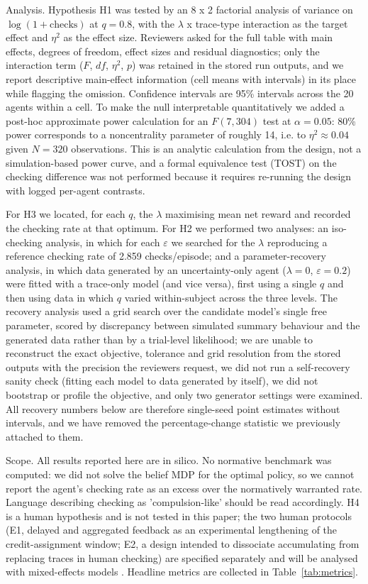 \documentclass[11pt,a4paper]{article}
\begin{document}
Analysis. Hypothesis H1 was tested by an 8 x 2 factorial analysis of variance on $\log(1+\text{checks})$ at $q=0.8$, with the $\lambda$ x trace-type interaction as the target effect and $\eta^2$ as the effect size. Reviewers asked for the full table with main effects, degrees of freedom, effect sizes and residual diagnostics; only the interaction term ($F$, $df$, $\eta^2$, $p$) was retained in the stored run outputs, and we report descriptive main-effect information (cell means with intervals) in its place while flagging the omission. Confidence intervals are 95\% intervals across the 20 agents within a cell. To make the null interpretable quantitatively we added a post-hoc approximate power calculation for an $F(7,304)$ test at $\alpha = 0.05$: 80\% power corresponds to a noncentrality parameter of roughly 14, i.e. to $\eta^2 \approx 0.04$ given $N = 320$ observations. This is an analytic calculation from the design, not a simulation-based power curve, and a formal equivalence test (TOST) on the checking difference was not performed because it requires re-running the design with logged per-agent contrasts.

For H3 we located, for each $q$, the $\lambda$ maximising mean net reward and recorded the checking rate at that optimum. For H2 we performed two analyses: an iso-checking analysis, in which for each $\varepsilon$ we searched for the $\lambda$ reproducing a reference checking rate of 2.859 checks/episode; and a parameter-recovery analysis, in which data generated by an uncertainty-only agent ($\lambda=0$, $\varepsilon=0.2$) were fitted with a trace-only model (and vice versa), first using a single $q$ and then using data in which $q$ varied within-subject across the three levels. The recovery analysis used a grid search over the candidate model's single free parameter, scored by discrepancy between simulated summary behaviour and the generated data rather than by a trial-level likelihood; we are unable to reconstruct the exact objective, tolerance and grid resolution from the stored outputs with the precision the reviewers request, we did not run a self-recovery sanity check (fitting each model to data generated by itself), we did not bootstrap or profile the objective, and only two generator settings were examined. All recovery numbers below are therefore single-seed point estimates without intervals, and we have removed the percentage-change statistic we previously attached to them.

Scope. All results reported here are in silico. No normative benchmark was computed: we did not solve the belief MDP for the optimal policy, so we cannot report the agent's checking rate as an excess over the normatively warranted rate. Language describing checking as 'compulsion-like' should be read accordingly. H4 is a human hypothesis and is not tested in this paper; the two human protocols (E1, delayed and aggregated feedback as an experimental lengthening of the credit-assignment window; E2, a design intended to dissociate accumulating from replacing traces in human checking) are specified separately and will be analysed with mixed-effects models \citep{bates2015fitting}. Headline metrics are collected in Table~\ref{tab:metrics}.
\end{document}
